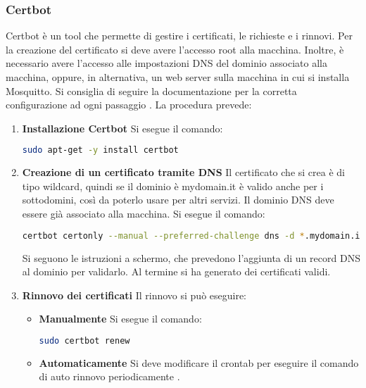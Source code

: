 \subsubsection{Certbot}
Certbot è un tool che permette di gestire i certificati, le richieste e i rinnovi.
Per la creazione del certificato si deve avere l'accesso root alla macchina.
Inoltre, è necessario avere l'accesso alle impostazioni DNS del dominio associato alla macchina,
oppure, in alternativa, un web server sulla macchina in cui si installa Mosquitto.\newline
Si consiglia di seguire la documentazione per la corretta configurazione ad ogni passaggio \cite{mosquitto-ssl-1}.\newline
La procedura prevede:
\begin{enumerate}
    \item \textbf{Installazione Certbot}\newline
    Si esegue il comando:
    \begin{lstlisting}[language=bash]
    sudo apt-get -y install certbot
    \end{lstlisting}
    \item \textbf{Creazione di un certificato tramite DNS}\newline
    Il certificato che si crea è di tipo wildcard, quindi se il dominio è mydomain.it è valido anche per i sottodomini,
    così da poterlo usare per altri servizi.
    Il dominio DNS deve essere già associato alla macchina.
    Si esegue il comando:
    \begin{lstlisting}[language=bash]
    certbot certonly --manual --preferred-challenge dns -d *.mydomain.it
    \end{lstlisting}
    Si seguono le istruzioni a schermo, che prevedono l'aggiunta di un record DNS al dominio per validarlo.
    Al termine si ha generato dei certificati validi.
    \item \textbf{Rinnovo dei certificati}\newline
    Il rinnovo si può eseguire:
    \begin{itemize}
        \item \textbf{Manualmente}\newline
        Si esegue il comando:
        \begin{lstlisting}[language=bash]
            sudo certbot renew
        \end{lstlisting}
        \item \textbf{Automaticamente}\newline
        Si deve modificare il crontab per eseguire il comando di auto rinnovo periodicamente \cite{mosquitto-ssl-4}.

\end{itemize}
\end{enumerate}
